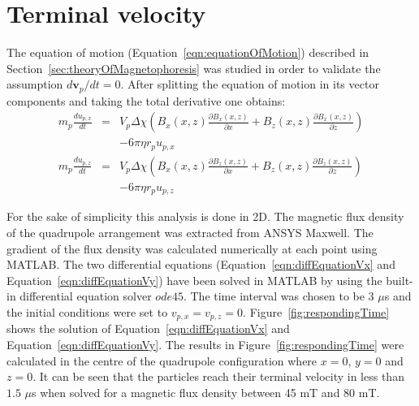 \chapter{Terminal velocity}\label{sec:terminalVelocity}
The equation of motion (Equation~\ref{eqn:equationOfMotion}) described in Section~\ref{sec:theoryOfMagnetophoresis} was studied in order to validate the assumption $d\textbf{v}_{p}/{dt} = 0$. After splitting the equation of motion in its vector components and taking the total derivative one obtains:
\begin{eqnarray}
 m_{p} \frac{du_{p,x}}{dt} &=& V_{p} \Delta \chi \left( B_{x}(x,z) \frac{\partial B_{x}(x,z)}{\partial x} + B_{z}(x,z)\frac{\partial B_{x}(x,z)}{\partial z}\right)\nonumber \\
 & & - 6\pi\eta r_{p} u_{p,x} \label{eqn:diffEquationVx} \\
 m_{p} \frac{du_{p,z}}{dt} &=& V_{p} \Delta \chi \left( B_{x}(x,z) \frac{\partial B_{z}(x,z)}{\partial x} + B_{z}(x,z)\frac{\partial B_{z}(x,z)}{\partial z}\right)\nonumber \\
 & & - 6\pi\eta r_{p} u_{p,z} \label{eqn:diffEquationVy}
\end{eqnarray}

For the sake of simplicity this analysis is done in 2D. The magnetic flux density of the quadrupole arrangement was extracted from ANSYS Maxwell. The gradient of the flux density was calculated numerically at each point using MATLAB. The two differential equations (Equation~\ref{eqn:diffEquationVx} and Equation~\ref{eqn:diffEquationVy}) have been solved in MATLAB by using the built-in differential equation solver $ode45$. The time interval was chosen to be $3$ $\mu$s and the initial conditions were set to $v_{p,x} = v_{p,z} = 0$. Figure~\ref{fig:respondingTime} shows the solution of Equation~\ref{eqn:diffEquationVx} and Equation~\ref{eqn:diffEquationVy}. The results in Figure~\ref{fig:respondingTime} were calculated in the centre of the quadrupole configuration where $x=0$, $y=0$ and $z=0$. It can be seen that the particles reach their terminal velocity in less than $1.5$ $\mu$s when solved for a magnetic flux density between 45 mT and 80 mT. %


